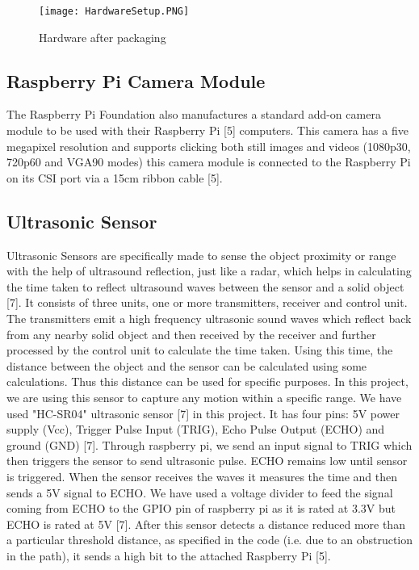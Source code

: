 \documentclass[letterpaper, 10 pt, conference]{ieeeconf}
\begin{document}
\begin{figure}[h!]
\centering
\texttt{[image: HardwareSetup.PNG]}
\caption{\label{fig:ipfinal}Hardware after packaging}
\end{figure}

\subsection{Raspberry Pi Camera Module} 
The Raspberry Pi Foundation also manufactures a standard add-on camera module to be used with their Raspberry Pi [5] computers. This camera has a five megapixel resolution and supports clicking both still images and videos (1080p30, 720p60 and VGA90 modes) this camera module is connected to the Raspberry Pi on its CSI port via a 15cm ribbon cable [5].

\subsection{Ultrasonic Sensor}
Ultrasonic Sensors are specifically made to sense the object proximity or range with the help of ultrasound reflection, just like a radar, which helps in calculating the time taken to reflect ultrasound waves between the sensor and a solid object [7]. It consists of three units, one or more transmitters, receiver and control unit. The transmitters emit a high frequency ultrasonic sound waves which reflect back from any nearby solid object and then received by the receiver and further processed by the control unit to calculate the time taken. Using this time, the distance between the object and the sensor can be calculated using some calculations. Thus this distance can be used for specific purposes. In this project, we are using this sensor to capture any motion within a specific range. We have used "HC-SR04" ultrasonic sensor [7] in this project. It has four pins: 5V power supply (Vcc), Trigger Pulse Input (TRIG), Echo Pulse Output (ECHO) and ground (GND) [7]. Through raspberry pi, we send an input signal to TRIG which then triggers the sensor to send ultrasonic pulse. ECHO remains low until sensor is triggered. When the sensor receives the waves it measures the time and then sends a 5V signal to ECHO. We have used a voltage divider to feed the signal coming from ECHO to the GPIO pin of raspberry pi as it is rated at 3.3V but ECHO is rated at 5V [7]. After this sensor detects a distance reduced more than a particular threshold distance, as specified in the code (i.e. due to an obstruction in the path), it sends a high bit to the attached Raspberry Pi [5].
\end{document}
